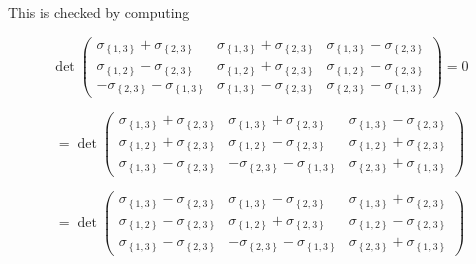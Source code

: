 \documentclass[11pt]{article}
\begin{document}
This is checked by computing

\begin{equation*}
\det \left( 
\begin{array}{ccc}
\sigma _{\left\{ 1,3\right\} }+\sigma _{\left\{ 2,3\right\} } & \sigma
_{\left\{ 1,3\right\} }+\sigma _{\left\{ 2,3\right\} } & \sigma _{\left\{
1,3\right\} }-\sigma _{\left\{ 2,3\right\} } \\ 
\sigma _{\left\{ 1,2\right\} }-\sigma _{\left\{ 2,3\right\} } & \sigma
_{\left\{ 1,2\right\} }+\sigma _{\left\{ 2,3\right\} } & \sigma _{\left\{
1,2\right\} }-\sigma _{\left\{ 2,3\right\} } \\ 
-\sigma _{\left\{ 2,3\right\} }-\sigma _{\left\{ 1,3\right\} } & \sigma
_{\left\{ 1,3\right\} }-\sigma _{\left\{ 2,3\right\} } & \sigma _{\left\{
2,3\right\} }-\sigma _{\left\{ 1,3\right\} }%
\end{array}%
\right) =0
\end{equation*}

\begin{equation*}
=\det \left( 
\begin{array}{ccc}
\sigma _{\left\{ 1,3\right\} }+\sigma _{\left\{ 2,3\right\} } & \sigma
_{\left\{ 1,3\right\} }+\sigma _{\left\{ 2,3\right\} } & \sigma _{\left\{
1,3\right\} }-\sigma _{\left\{ 2,3\right\} } \\ 
\sigma _{\left\{ 1,2\right\} }+\sigma _{\left\{ 2,3\right\} } & \sigma
_{\left\{ 1,2\right\} }-\sigma _{\left\{ 2,3\right\} } & \sigma _{\left\{
1,2\right\} }+\sigma _{\left\{ 2,3\right\} } \\ 
\sigma _{\left\{ 1,3\right\} }-\sigma _{\left\{ 2,3\right\} } & -\sigma
_{\left\{ 2,3\right\} }-\sigma _{\left\{ 1,3\right\} } & \sigma _{\left\{
2,3\right\} }+\sigma _{\left\{ 1,3\right\} }%
\end{array}%
\right) 
\end{equation*}

\begin{equation*}
=\det \left( 
\begin{array}{ccc}
\sigma _{\left\{ 1,3\right\} }-\sigma _{\left\{ 2,3\right\} } & \sigma
_{\left\{ 1,3\right\} }-\sigma _{\left\{ 2,3\right\} } & \sigma _{\left\{
1,3\right\} }+\sigma _{\left\{ 2,3\right\} } \\ 
\sigma _{\left\{ 1,2\right\} }-\sigma _{\left\{ 2,3\right\} } & \sigma
_{\left\{ 1,2\right\} }+\sigma _{\left\{ 2,3\right\} } & \sigma _{\left\{
1,2\right\} }-\sigma _{\left\{ 2,3\right\} } \\ 
\sigma _{\left\{ 1,3\right\} }-\sigma _{\left\{ 2,3\right\} } & -\sigma
_{\left\{ 2,3\right\} }-\sigma _{\left\{ 1,3\right\} } & \sigma _{\left\{
2,3\right\} }+\sigma _{\left\{ 1,3\right\} }%
\end{array}%
\right) 
\end{equation*}
\end{document}
